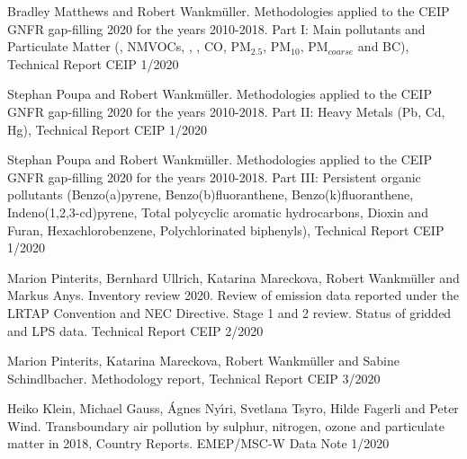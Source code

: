 \enlargethispage{\baselineskip}
\begin{list}{}{\setlength{\leftmargin}{15pt}\setlength{\itemindent}{-\leftmargin}}\small

\item[]  
  Bradley Matthews and Robert Wankm\"uller.
  Methodologies applied to the CEIP GNFR gap-filling 2020 for the years 2010-2018. Part I: Main pollutants and Particulate Matter (\nox, NMVOCs, \sox, \nhiii, CO, PM$_{2.5}$, PM$_{10}$, PM$_{coarse}$ and BC),  Technical Report CEIP 1/2020

\item[]
  Stephan Poupa and Robert Wankm\"uller.
  Methodologies applied to the CEIP GNFR gap-filling 2020 for the years 2010-2018. Part II: Heavy Metals (Pb, Cd, Hg),  Technical Report CEIP 1/2020

\item[]
  Stephan Poupa and Robert Wankm\"uller. 
Methodologies applied to the CEIP GNFR gap-filling 2020 for the years 2010-2018. Part III: Persistent organic pollutants (Benzo(a)pyrene, Benzo(b)fluoranthene, Benzo(k)fluoranthene, Indeno(1,2,3-cd)pyrene, Total polycyclic aromatic hydrocarbons, Dioxin and Furan, Hexachlorobenzene, Polychlorinated biphenyls), Technical Report CEIP 1/2020
  
  
\item[]
  Marion Pinterits, Bernhard Ullrich, Katarina Mareckova, Robert  Wankm\"uller and Markus Anys. 
  Inventory review 2020. Review of emission data reported under the LRTAP
Convention and NEC Directive.  Stage 1 and 2 review. Status of gridded
and LPS data. Technical Report CEIP 2/2020

\item[]
  Marion Pinterits, Katarina Mareckova, Robert Wankm\"uller  and Sabine Schindlbacher.
  Methodology report, Technical Report CEIP 3/2020

  

\end{list}



 \enlargethispage{\baselineskip}
 \begin{list}{}{\setlength{\leftmargin}{15pt}\setlength{\itemindent}{-\leftmargin}}\small

 \item[]
 Heiko Klein, Michael Gauss, \'Agnes  Ny\'{\i}ri, Svetlana Tsyro, Hilde Fagerli and Peter Wind. 
Transboundary air pollution by sulphur, nitrogen, ozone and particulate matter in 2018, Country Reports. EMEP/MSC-W Data Note 1/2020


 \end{list}



